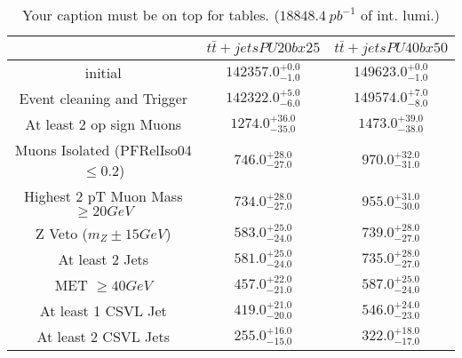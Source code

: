 \documentclass{article}
\begin{document}
\begin{table}
\caption{Your caption must be on top for tables. ($18848.4~pb^{-1}$ of int. lumi.)}
\label{tab:}
\centering
\begin{tabular}{|c|cc|}
\toprule
&$t\bar{t}+jets PU20bx25$	&$t\bar{t}+jets PU40bx50$	\\

\midrule
initial&	$142357.0^{+0.0}_{-1.0}$	&$149623.0^{+0.0}_{-1.0}$	\\

Event cleaning and Trigger&	$142322.0^{+5.0}_{-6.0}$	&$149574.0^{+7.0}_{-8.0}$	\\

At least 2 op sign Muons&	$1274.0^{+36.0}_{-35.0}$	&$1473.0^{+39.0}_{-38.0}$	\\

Muons Isolated (PFRelIso04$\leq 0.2$)&	$746.0^{+28.0}_{-27.0}$	&$970.0^{+32.0}_{-31.0}$	\\

Highest 2 pT Muon Mass $\geq 20 GeV$&	$734.0^{+28.0}_{-27.0}$	&$955.0^{+31.0}_{-30.0}$	\\

Z Veto ($m_{Z}\pm 15 GeV$)&	$583.0^{+25.0}_{-24.0}$	&$739.0^{+28.0}_{-27.0}$	\\

At least 2 Jets&	$581.0^{+25.0}_{-24.0}$	&$735.0^{+28.0}_{-27.0}$	\\

MET $\geq 40 GeV$&	$457.0^{+22.0}_{-21.0}$	&$587.0^{+25.0}_{-24.0}$	\\

At least 1 CSVL Jet&	$419.0^{+21.0}_{-20.0}$	&$546.0^{+24.0}_{-23.0}$	\\

At least 2 CSVL Jets&	$255.0^{+16.0}_{-15.0}$	&$322.0^{+18.0}_{-17.0}$	\\

\bottomrule
\end{tabular}
\end{table}
\end{document}
